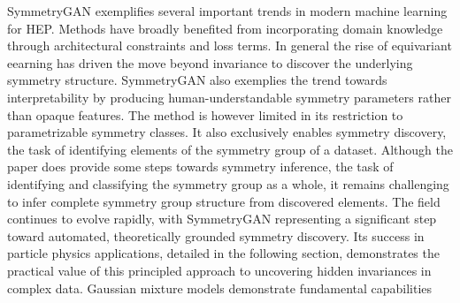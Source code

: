         SymmetryGAN exemplifies several important trends in modern machine learning for HEP.
        Methods have broadly benefited from incorporating domain knowledge through architectural constraints and loss terms.
        In general the rise of equivariant eearning has driven the move beyond invariance to discover the underlying symmetry structure.
        SymmetryGAN also exemplies the trend towards interpretability by producing human-understandable symmetry parameters rather than opaque features.
        The method is however limited in its restriction to parametrizable symmetry classes.
        It also exclusively enables symmetry discovery, the task of identifying elements of the symmetry group of a dataset.
        Although the paper does provide some steps towards symmetry inference, the task of identifying and classifying the symmetry group as a whole, it remains challenging to infer complete symmetry group structure from discovered elements.
        The field continues to evolve rapidly, with SymmetryGAN representing a significant step toward automated, theoretically grounded symmetry discovery.
        Its success in particle physics applications, detailed in the following section, demonstrates the practical value of this principled approach to uncovering hidden invariances in complex data.
        Gaussian mixture models demonstrate fundamental capabilities
